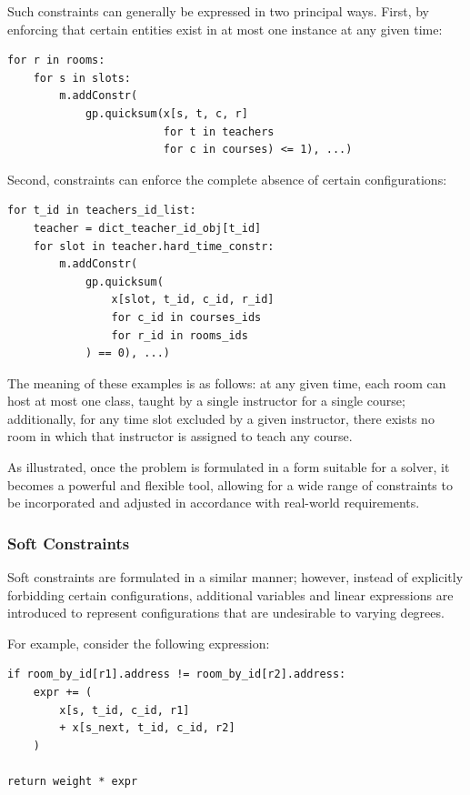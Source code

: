 \documentclass[11pt,a4paper]{article}
\begin{document}
Such constraints can generally be expressed in two principal ways. First, by enforcing that certain entities exist in at most one instance at any given time: 

\begin{verbatim}
for r in rooms:                                  
    for s in slots:                              
        m.addConstr(
            gp.quicksum(x[s, t, c, r]
                        for t in teachers
                        for c in courses) <= 1), ...)
\end{verbatim}

Second, constraints can enforce the complete absence of certain configurations:
\begin{verbatim}
for t_id in teachers_id_list:
    teacher = dict_teacher_id_obj[t_id]
    for slot in teacher.hard_time_constr:
        m.addConstr(
            gp.quicksum(
                x[slot, t_id, c_id, r_id]
                for c_id in courses_ids
                for r_id in rooms_ids
            ) == 0), ...)
\end{verbatim}

The meaning of these examples is as follows: at any given time, each room can host at most one class, taught by a single instructor for a single course; additionally, for any time slot excluded by a given instructor, there exists no room in which that instructor is assigned to teach any course.

As illustrated, once the problem is formulated in a form suitable for a solver, it becomes a powerful and flexible tool, allowing for a wide range of constraints to be incorporated and adjusted in accordance with real-world requirements.
\subsubsection{Soft Constraints}
Soft constraints are formulated in a similar manner; however, instead of explicitly forbidding certain configurations, additional variables and linear expressions are introduced to represent configurations that are undesirable to varying degrees.

For example, consider the following expression:
\begin{verbatim}
if room_by_id[r1].address != room_by_id[r2].address:
    expr += (
        x[s, t_id, c_id, r1]
        + x[s_next, t_id, c_id, r2]
    )

return weight * expr
\end{verbatim}
\end{document}
